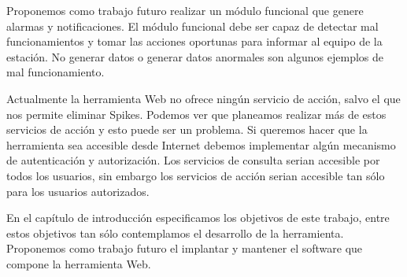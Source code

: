 \begin{description}[style=unboxed,leftmargin=0cm,labelwidth=1cm]
				Proponemos como trabajo futuro realizar un módulo funcional que genere alarmas y notificaciones.  El módulo funcional
				debe ser capaz de detectar mal funcionamientos y tomar las acciones oportunas para informar al equipo de la estación.
				No generar datos o generar datos anormales son algunos ejemplos de mal funcionamiento.
			\item[Autenticación y autorización]
				Actualmente la herramienta Web no ofrece ningún servicio de acción, salvo el que nos permite eliminar Spikes. Podemos
				ver que planeamos realizar más de estos servicios de acción y esto puede ser un problema. Si queremos hacer que la
				herramienta sea accesible desde Internet debemos implementar algún mecanismo de autenticación y autorización. Los
				servicios de consulta serian accesible por todos los usuarios, sin embargo los servicios de acción serian accesible
				tan sólo para los usuarios autorizados.
			\item[Implantación y Mantenimiento]
				En el capítulo de introducción especificamos los objetivos de este trabajo, entre estos objetivos tan sólo
				contemplamos el desarrollo de la herramienta. Proponemos como trabajo futuro el implantar y mantener el software que
				compone la herramienta Web. 
		\end{description}
